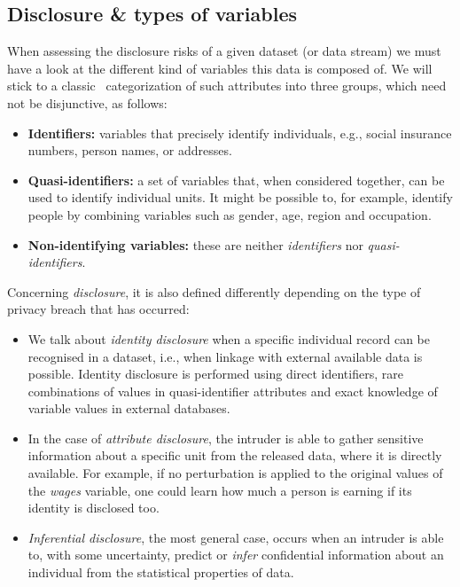 \subsection{Disclosure \& types of variables}
\label{Theory:SDC:DisclosureTypes}

When assessing the disclosure risks of a given dataset (or data stream) we must have a look at the different kind of variables this data is composed of. We will stick to a classic~\citep{Templ:IntroSDC} categorization of such attributes into three groups, which need not be disjunctive, as follows:

\begin{itemize}
	\item \textbf{Identifiers:} variables that precisely identify individuals, e.g., social insurance numbers, person names, or addresses.
	\item \textbf{Quasi-identifiers:} a set of variables that, when considered together, can be used to identify individual units. It might be possible to, for example, identify people by combining variables such as gender, age, region and occupation.
	\item \textbf{Non-identifying variables:} these are neither \textit{identifiers} nor \textit{quasi-identifiers}.
\end{itemize}

Concerning \textit{disclosure}, it is also defined differently depending on the type of privacy breach that has occurred:

\begin{itemize}
	\item We talk about \textit{identity disclosure} when a specific individual record can be recognised in a dataset, i.e., when linkage with external available data is possible. Identity disclosure is performed using direct identifiers, rare combinations of values in quasi-identifier attributes and exact knowledge of variable values in external databases.
	\item In the case of \textit{attribute disclosure}, the intruder is able to gather sensitive information about a specific unit from the released data, where it is directly available. For example, if no perturbation is applied to the original values of the \textit{wages} variable, one could learn how much a person is earning if its identity is disclosed too.
	\item \textit{Inferential disclosure}, the most general case, occurs when an intruder is able to, with some uncertainty, predict or \textit{infer} confidential information about an individual from the statistical properties of data.
\end{itemize}

